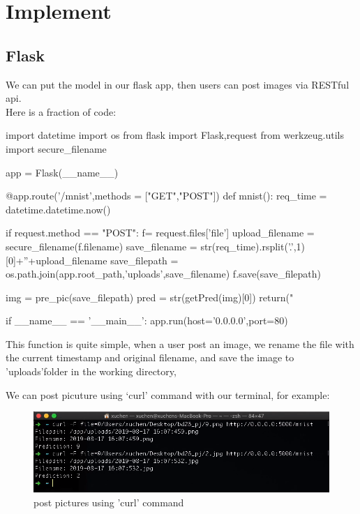 \documentclass[12pt,hyperref,]{ctexart}
\begin{document}
\newpage

\section{Implement}\label{implement}

\subsection{Flask}\label{flask}

We can put the model in our flask app, then users can post images via
RESTful api.\\
Here is a fraction of code:

\begin{python}
import datetime
import os
from flask import Flask,request
from werkzeug.utils import secure_filename

app = Flask(__name__)

@app.route('/mnist',methods = ["GET","POST"])
def mnist():
    req_time = datetime.datetime.now()

    if request.method == "POST":
        f= request.files['file']
        upload_filename = secure_filename(f.filename)
        save_filename = str(req_time).rsplit('.',1)[0]+''+upload_filename
        save_filepath = os.path.join(app.root_path,'uploads',save_filename)
        f.save(save_filepath)
            
        img = pre_pic(save_filepath)
        pred = str(getPred(img)[0])
        return("%
        
if __name__ == '__main__':
    app.run(host='0.0.0.0',port=80)
\end{python}

This function is quite simple, when a user post an image, we rename the
file with the current timestamp and original filename, and save the
image to 'uploads'folder in the working directory,

We can post picuture using `curl' command with our terminal, for
example:

\begin{figure}[H]
\centering
\includegraphics[width=6in]{curl.png}
\caption{post pictures using 'curl' command}
\end{figure}
\end{document}
